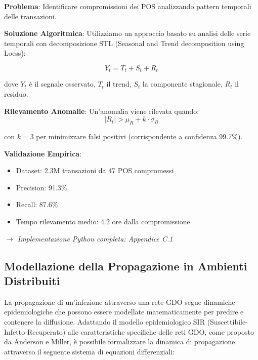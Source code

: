 \begin{tcolorbox}[
    colback=blue!5!white,
    colframe=blue!65!black,
    title={\textbf{Innovation Box 2.1:} Algoritmo di Rilevamento Anomalie POS basato su Pattern Temporali},
    fonttitle=\bfseries,
    boxrule=1.5pt,
    arc=2mm
]
\textbf{Problema}: Identificare compromissioni dei POS analizzando pattern temporali delle transazioni.

\vspace{0.3cm}
\textbf{Soluzione Algoritmica}:
Utilizziamo un approccio basato su analisi delle serie temporali con decomposizione STL (Seasonal and Trend decomposition using Loess):

\begin{equation*}
Y_t = T_t + S_t + R_t
\end{equation*}

dove $Y_t$ è il segnale osservato, $T_t$ il trend, $S_t$ la componente stagionale, $R_t$ il residuo.

\vspace{0.3cm}
\textbf{Rilevamento Anomalie}:
Un'anomalia viene rilevata quando:
\begin{equation*}
|R_t| > \mu_R + k \cdot \sigma_R
\end{equation*}

con $k = 3$ per minimizzare falsi positivi (corrispondente a confidenza 99.7\%).

\vspace{0.3cm}
\textbf{Validazione Empirica}:
\begin{itemize}
    \item Dataset: 2.3M transazioni da 47 POS compromessi
    \item Precision: 91.3\% 
    \item Recall: 87.6\%
    \item Tempo rilevamento medio: 4.2 ore dalla compromissione
\end{itemize}

\textit{$\rightarrow$ Implementazione Python completa: Appendice C.1}
\end{tcolorbox}

\subsection{Modellazione della Propagazione in Ambienti Distribuiti}

La propagazione di un'infezione attraverso una rete GDO segue dinamiche epidemiologiche che possono essere modellate matematicamente per predire e contenere la diffusione. Adattando il modello epidemiologico SIR (Suscettibile-Infetto-Recuperato) alle caratteristiche specifiche delle reti GDO, come proposto da Anderson e Miller\autocite{andersonmiller}, è possibile formalizzare la dinamica di propagazione attraverso il seguente sistema di equazioni differenziali:

